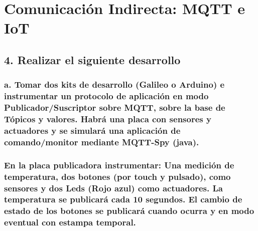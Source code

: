 \documentclass[11pt]{article}
\begin{document}
    \hypertarget{comunicaciuxf3n-indirecta-mqtt-e-iot}{%
\section{Comunicación Indirecta: MQTT e
IoT}\label{comunicaciuxf3n-indirecta-mqtt-e-iot}}

    \hypertarget{realizar-el-siguiente-desarrollo}{%
\subsection{4. Realizar el siguiente
desarrollo}\label{realizar-el-siguiente-desarrollo}}

    \hypertarget{a.-tomar-dos-kits-de-desarrollo-galileo-o-arduino-e-instrumentar-un-protocolo-de-aplicaciuxf3n-en-modo-publicadorsuscriptor-sobre-mqtt-sobre-la-base-de-tuxf3picos-y-valores.-habruxe1-una-placa-con-sensores-y-actuadores-y-se-simularuxe1-una-aplicaciuxf3n-de-comandomonitor-mediante-mqtt-spy-java.}{%
\subsubsection{a. Tomar dos kits de desarrollo (Galileo o Arduino) e
instrumentar un protocolo de aplicación en modo Publicador/Suscriptor
sobre MQTT, sobre la base de Tópicos y valores. Habrá una placa con
sensores y actuadores y se simulará una aplicación de comando/monitor
mediante MQTT-Spy
(java).}\label{a.-tomar-dos-kits-de-desarrollo-galileo-o-arduino-e-instrumentar-un-protocolo-de-aplicaciuxf3n-en-modo-publicadorsuscriptor-sobre-mqtt-sobre-la-base-de-tuxf3picos-y-valores.-habruxe1-una-placa-con-sensores-y-actuadores-y-se-simularuxe1-una-aplicaciuxf3n-de-comandomonitor-mediante-mqtt-spy-java.}}

\hypertarget{en-la-placa-publicadora-instrumentar-una-mediciuxf3n-de-temperatura-dos-botones-por-touch-y-pulsado-como-sensores-y-dos-leds-rojo-azul-como-actuadores.-la-temperatura-se-publicaruxe1-cada-10-segundos.-el-cambio-de-estado-de-los-botones-se-publicaruxe1-cuando-ocurra-y-en-modo-eventual-con-estampa-temporal.}{%
\subsubsection{En la placa publicadora instrumentar: Una medición de
temperatura, dos botones (por touch y pulsado), como sensores y dos Leds
(Rojo azul) como actuadores. La temperatura se publicará cada 10
segundos. El cambio de estado de los botones se publicará cuando ocurra
y en modo eventual con estampa
temporal.}\label{en-la-placa-publicadora-instrumentar-una-mediciuxf3n-de-temperatura-dos-botones-por-touch-y-pulsado-como-sensores-y-dos-leds-rojo-azul-como-actuadores.-la-temperatura-se-publicaruxe1-cada-10-segundos.-el-cambio-de-estado-de-los-botones-se-publicaruxe1-cuando-ocurra-y-en-modo-eventual-con-estampa-temporal.}}
\end{document}
